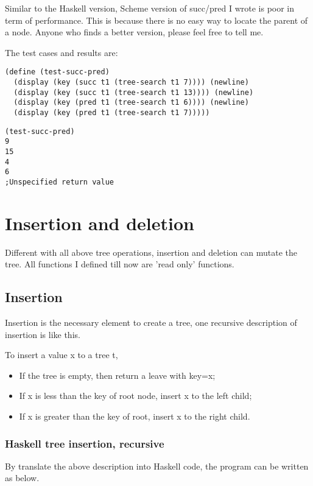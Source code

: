 \documentclass{article}
\begin{document}
Similar to the Haskell version, Scheme version of succ/pred I wrote is poor
in term of performance. This is because there is no easy way to locate the
parent of a node. Anyone who finds a better version, please feel free to 
tell me.

The test cases and results are:

\begin{lstlisting}
(define (test-succ-pred)
  (display (key (succ t1 (tree-search t1 7)))) (newline)
  (display (key (succ t1 (tree-search t1 13)))) (newline)
  (display (key (pred t1 (tree-search t1 6)))) (newline)
  (display (key (pred t1 (tree-search t1 7)))))
\end{lstlisting}

\begin{verbatim}
(test-succ-pred)
9
15
4
6
;Unspecified return value
\end{verbatim}

\section{Insertion and deletion}

Different with all above tree operations, insertion and deletion can mutate
the tree. All functions I defined till now are 'read only' functions.

\subsection{Insertion}
Insertion is the necessary element to create a tree, one recursive description
of insertion is like this.

To insert a value x to a tree t,
\begin{itemize}
\item If the tree is empty, then return a leave with key=x;
\item If x is less than the key of root node, insert x to the left child;
\item If x is greater than the key of root, insert x to the right child.
\end{itemize}

\subsubsection*{Haskell tree insertion, recursive}
By translate the above description into Haskell code, the program can be written
as below.
\end{document}
